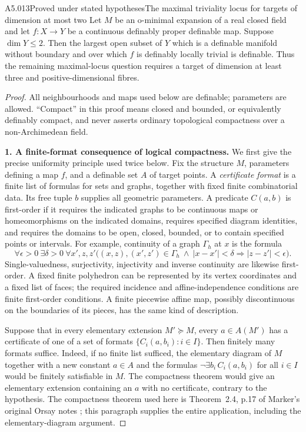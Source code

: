 \begin{saresult}{A5.013}{Proved under stated hypotheses}{The maximal triviality locus for targets of dimension at most two}
Let $M$ be an o-minimal expansion of a real closed field and let
$f:X\to Y$ be a continuous definably proper definable map.  Suppose
$\dim Y\leq2$.  Then the largest open subset of $Y$ which is a
definable manifold without boundary and over which $f$ is definably
locally trivial is definable.  Thus the remaining maximal-locus
question requires a target of dimension at least three and
positive-dimensional fibres.
\end{saresult}
\begin{proof}
All neighbourhoods and maps used below are definable; parameters
are allowed.  ``Compact'' in this proof means closed and bounded,
or equivalently definably compact, and never asserts ordinary
topological compactness over a non-Archimedean field.

\medskip\noindent\textbf{1. A finite-format consequence of logical compactness.}
We first give the precise uniformity principle used twice below.
Fix the structure $M$, parameters defining a map $f$, and a
definable set $A$ of target points.  A \emph{certificate format}
is a finite list of formulas for sets and graphs, together with
fixed finite combinatorial data.  Its free tuple $b$ supplies all
geometric parameters.  A predicate $C(a,b)$ is first-order if it
requires the indicated graphs to be continuous maps or
homeomorphisms on the indicated domains, requires specified
diagram identities, and requires the domains to be open, closed,
bounded, or to contain specified points or intervals.  For
example, continuity of a graph $\Gamma_h$ at $x$ is the formula
\[
 \forall\epsilon>0\ \exists\delta>0\ \forall x',z,z'
 \bigl((x,z),(x',z')\in\Gamma_h\ \wedge\ |x-x'|<\delta
       \Longrightarrow |z-z'|<\epsilon\bigr).
\]
Single-valuedness, surjectivity, injectivity and inverse continuity
are likewise first-order.  A fixed finite polyhedron can be
represented by its vertex coordinates and a fixed list of faces;
the required incidence and affine-independence conditions are
finite first-order conditions.  A finite piecewise affine map,
possibly discontinuous on the boundaries of its pieces, has the
same kind of description.

Suppose that in every elementary extension $M'\succeq M$, every
$a\in A(M')$ has a certificate of one of a set of formats
$\{C_i(a,b_i):i\in I\}$.  Then finitely many formats suffice.
Indeed, if no finite list sufficed, the elementary diagram of $M$
together with a new constant $a\in A$ and the formulas
$\neg\exists b_i\,C_i(a,b_i)$ for all $i\in I$ would be finitely
satisfiable in $M$.  The compactness theorem would give an
elementary extension containing an $a$ with no certificate,
contrary to the hypothesis.  The compactness theorem used here is
Theorem~2.4, p.17 of Marker's original Orsay notes
\cite{A5-Marker2010}; this paragraph supplies the entire
application, including the elementary-diagram argument.


\end{proof}
